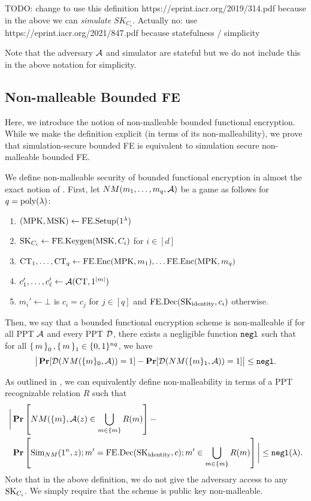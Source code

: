 TODO: change to use this definition https://eprint.iacr.org/2019/314.pdf
because in the above we can \emph{simulate} $SK_{C_i}$.
Actually no: use https://eprint.iacr.org/2021/847.pdf because statefulness / simplicity

Note that the adversary $\mathcal{A}$ and simulator are stateful but we do not include this in the above notation for simplicity.

\subsection{Non-malleable Bounded FE}
Here, we introduce the notion of non-malleable bounded functional encryption.
While we make the definition explicit (in terms of its non-malleability), we prove
that simulation-secure bounded FE is equivalent to simulation secure non-malleable bounded FE.

We define non-malleable security of bounded functional encryption in almost the exact
notion of \cite{PassNM}. First,
let $NM(m_1, \dots, m_q, \mathcal{A})$ be a game as follows for $q = \operatorname{poly}(\lambda)$:
\begin{enumerate}
	\item $(\text{MPK}, \text{MSK}) \gets \text{FE.Setup}(1^\lambda)$
	\item $\text{SK}_{C_i} \gets \text{FE.Keygen}(\text{MSK}, C_i)$ for $i \in [d]$
	\item $\text{CT}_1, \dots, \text{CT}_q \gets \text{FE.Enc}(\text{MPK}, m_1), \dots \text{FE.Enc}(\text{MPK}, m_q)$
	\item $c_1', \dots, c_\ell' \gets \mathcal{A}(\text{CT}, 1^{|m|})$
	\item $m_i' \gets \bot$ is $c_i = c_j$ for $j \in [q]$ and $\text{FE.Dec}(\text{SK}_{\text{identity}}, c_i)$ otherwise.
\end{enumerate}
Then, we say that a bounded functional encryption scheme is non-malleable if for all PPT $\mathcal{A}$
and every PPT $\mathcal{D}$, there exists a negligible function $\texttt{negl}$ such that
for all $\set{m}_0, \set{m}_1 \in \{0, 1\}^{nq}$, we have
\begin{equation}
	\big|\operatorname*{\mathbf{Pr}}[\mathcal{D}(NM(\{m\}_0, \mathcal{A})) = 1] - \operatorname*{\mathbf{Pr}}[\mathcal{D}(NM(\{m\}_1 , \mathcal{A})) = 1] \big|\leq \texttt{negl}.
\end{equation}

As outlined in \cite{PassNM}, we can equivalently define non-malleability in terms of a PPT recognizable relation $R$
such that
\begin{align*}
	\label{eq:NMRel}
	\bigg|\operatorname*{\mathbf{Pr}}&\left[NM(\{m\} , \mathcal{A}(z) \in \bigcup_{m \in \{m\}} R(m)\right]- \\
				\operatorname*{\mathbf{Pr}}&\left[\text{Sim}_{NM}(1^n, z); m' = \text{FE.Dec}(\text{SK}_{\text{identity}}, c); m' \in \bigcup_{m \in \{m\}} R(m)\right]\bigg| \leq \texttt{negl}(\lambda).
\end{align*}
Note that in the above definition, we do not give the adversary access to any $\text{SK}_{C_i}$.
We simply require that the scheme is public key non-malleable.

